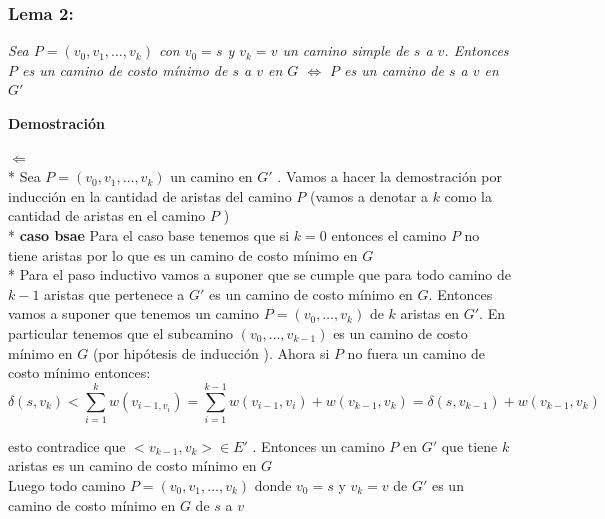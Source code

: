 \documentclass{article}
\begin{document}
    \subsubsection{Lema 2:}
        
    \noindent \textit{Sea $P = \left(v_0,v_1,\dots , v_k \right)$ con $v_0 = s$ y $v_k = v$ un camino simple de $s$ a $v$. Entonces $P$ es un 
    camino de costo m\'inimo de $s$ a $v$  en $G$ $\Longleftrightarrow$  $P$ es un camino de $s$ a $v$ en $G'$}
    
    
    \vspace{0.3cm}
    \noindent \textbf{Demostraci\'on} 
    
    \noindent $ \Longleftarrow $
    \\*
    Sea $P = \left(v_0,v_1,\dots , v_k \right)$  un camino en $G'$ . 
    Vamos a hacer la demostraci\'on por inducci\'on en la cantidad de aristas del camino $P$ (vamos a denotar a $k$ como la cantidad de aristas en el camino $P$ )
    \\*
    \noindent \textbf{caso bsae} 
    Para el caso base tenemos que si $k=0$ entonces el camino $P$ no tiene aristas por lo que es un camino de costo m\'inimo en $G$ 
    \\*
    Para el paso inductivo vamos a suponer que se cumple que para todo camino de $k-1$ aristas que pertenece a  $G'$ es un camino de costo m\'inimo en $G$. 
    Entonces vamos a suponer que tenemos un camino $P = \left(v_{0},\dots,v_{k}\right)$  de $k$ aristas en $G'$. En particular tenemos que el subcamino $\left(v_0,\dots,v_{k-1}\right)$ es un camino de 
    costo m\'inimo en $G$ (por hip\'otesis de inducci\'on ). Ahora si $P$ no fuera un camino de costo m\'inimo entonces: 
    \begin{equation*}
        \delta \left(s,v_k\right) < \sum_{i=1}^{k} w\left(v_{i-1,v_i}\right) = \sum_{i=1}^{k-1} w\left(v_{i-1}, v_{i}\right) + w\left(v_{k-1}, v_{k}\right)  = \delta\left(s,v_{k-1}\right) + w\left(v_{k-1}, v_{k}\right)
    \end{equation*}

    \noindent esto contradice que $<v_{k-1}, v_{k}> \in E'$ . Entonces un camino $P$  en $G'$ que tiene $k$ aristas es un camino de costo m\'inimo en $G$ 
    \\
    Luego todo camino $P = \left(v_0,v_1,\dots , v_k \right)$ donde $v_{0}=s$ y $v_{k}=v$ de $G'$ es un camino  de costo m\'inimo en $G$ de $s$ a $v$ 
    
    \vspace*{0.5cm} 
\end{document}
